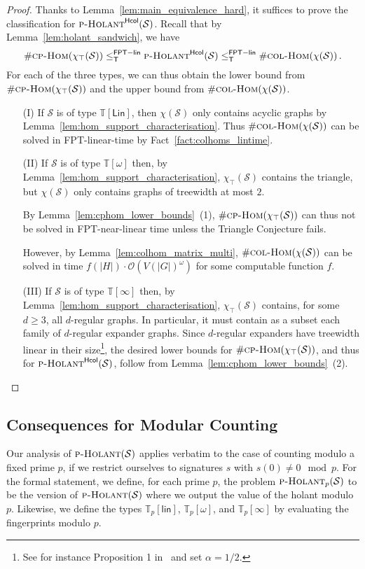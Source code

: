\documentclass[authorcolumns,numberwithinsect]{no-lipics-v2022}
\newcommand{\homsupp}{\chi}
\newcommand{\cphomsprob}{\text{\sc{cp-Hom}}}
\newcommand{\colhomsprob}{\text{\sc{col-Hom}}}
\newcommand{\fptlinred}{\leq^{\mathsf{FPT-lin}}_{\mathsf{T}}}
\newcommand{\holantprob}{\text{\sc{p-Holant}}}
\newcommand{\holantprobstar}{\text{\sc{p-Holant}}^{\mathsf{Hcol}}}
\begin{document}
\begin{proof}
Thanks to Lemma~\ref{lem:main_equivalence_hard}, it suffices to prove the classification for $\holantprobstar(\mathcal{S})$. Recall that by Lemma~\ref{lem:holant_sandwich}, we have
\[\#\cphomsprob(\homsupp_\top(\mathcal{S})) \fptlinred \holantprobstar(\mathcal{S}) \fptlinred \#\colhomsprob(\homsupp(\mathcal{S})) \,.\]
For each of the three types, we can thus obtain the lower bound from $\#\cphomsprob(\homsupp_\top(\mathcal{S}))$ and the upper bound from $\#\colhomsprob(\homsupp(\mathcal{S}))$.
\begin{itemize}
    \item[(I)] If $\mathcal{S}$ is of type $\mathbb{T}[\mathsf{Lin}]$, then $\homsupp(\mathcal{S})$ only contains acyclic graphs by Lemma~\ref{lem:hom_support_characterisation}. Thus $\#\colhomsprob(\homsupp(\mathcal{S}))$ can be solved in FPT-linear-time by Fact~\ref{fact:colhoms_lintime}.
    \item[(II)] If $\mathcal{S}$ is of type $\mathbb{T}[\omega]$ then, by Lemma~\ref{lem:hom_support_characterisation}, $\homsupp_\top(\mathcal{S})$ contains the triangle, but $\homsupp(\mathcal{S})$ only contains graphs of treewidth at most $2$. 
    
    By Lemma~\ref{lem:cphom_lower_bounds}~(1), $\#\cphomsprob(\homsupp_\top(\mathcal{S}))$ can thus not be solved in FPT-near-linear time unless the Triangle Conjecture fails.  

    However, by Lemma~\ref{lem:colhom_matrix_multi}, $\#\colhomsprob(\homsupp(\mathcal{S}))$ can be solved in time $f(|H|)\cdot \mathcal{O}(V(|G|)^{\omega})$ for some computable function $f$.
    \item[(III)]
    If $\mathcal{S}$ is of type $\mathbb{T}[\infty]$ then, by Lemma~\ref{lem:hom_support_characterisation}, $\homsupp_\top(\mathcal{S})$ contains, for some $d\geq 3$, all $d$-regular graphs. In particular, it must contain as a subset each family of $d$-regular expander graphs. Since $d$-regular expanders have treewidth linear in their size\footnote{See for instance Proposition 1 in~\cite{Grohe&2009expansion} and set $\alpha=1/2$.}, the desired lower bounds for $\#\cphomsprob(\homsupp_\top(\mathcal{S}))$, and thus for $\holantprobstar(\mathcal{S})$, follow from Lemma~\ref{lem:cphom_lower_bounds}~(2).
\end{itemize}
\end{proof}

\subsection{Consequences for Modular Counting}\label{sec:modular}
Our analysis of $\holantprob(\mathcal{S})$ applies verbatim to the case of counting modulo a fixed prime $p$, if we restrict ourselves to signatures $s$ with $s(0)\neq 0\mod p$. For the formal statement, we define, for each prime $p$, the problem $\holantprob_p(\mathcal{S})$ to be the version of $\holantprob(\mathcal{S})$ where we output the value of the holant modulo $p$. Likewise, we define the types $\mathbb{T}_p[\mathsf{lin}]$, $\mathbb{T}_p[\omega]$, and $\mathbb{T}_p[\infty]$ by evaluating the fingerprints modulo $p$.
\end{document}
